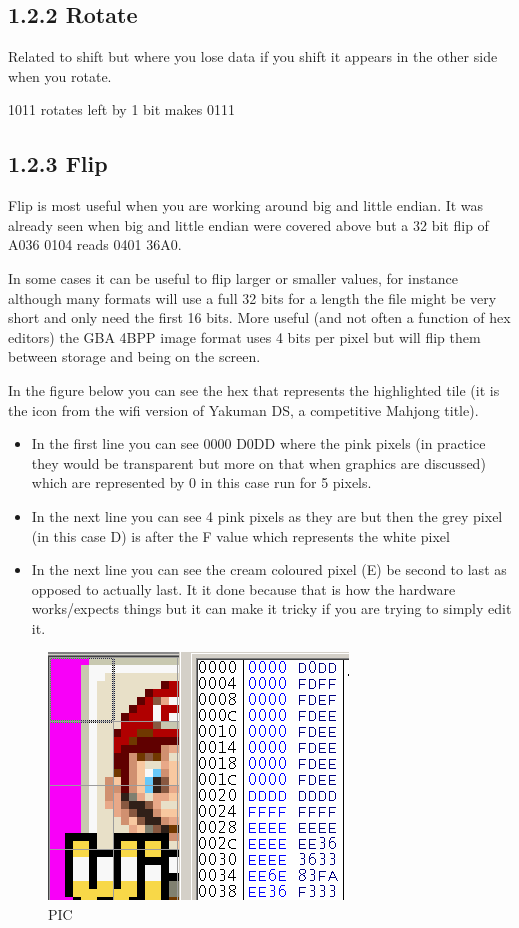 \documentclass[
]{book}
\providecommand{\tightlist}{%
  \setlength{\itemsep}{0pt}\setlength{\parskip}{0pt}}
\begin{document}
\hypertarget{rotate}{%
\subsection{1.2.2 Rotate}\label{rotate}}

Related to shift but where you lose data if you shift it appears in the other side when you rotate.

1011 rotates left by 1 bit makes 0111

\hypertarget{flip}{%
\subsection{1.2.3 Flip}\label{flip}}

Flip is most useful when you are working around big and little endian. It was already seen when big and little endian were covered above but a 32 bit flip of A036 0104 reads 0401 36A0.

In some cases it can be useful to flip larger or smaller values, for instance although many formats will use a full 32 bits for a length the file might be very short and only need the first 16 bits. More useful (and not often a function of hex editors) the GBA 4BPP image format uses 4 bits per pixel but will flip them between storage and being on the screen.

In the figure below you can see the hex that represents the highlighted tile (it is the icon from the wifi version of Yakuman DS, a competitive Mahjong title).

\begin{itemize}
\tightlist
\item
  In the first line you can see 0000 D0DD where the pink pixels (in practice they would be transparent but more on that when graphics are discussed) which are represented by 0 in this case run for 5 pixels.
\item
  In the next line you can see 4 pink pixels as they are but then the grey pixel (in this case D) is after the F value which represents the white pixel
\item
  In the next line you can see the cream coloured pixel (E) be second to last as opposed to actually last. It it done because that is how the hardware works/expects things but it can make it tricky if you are trying to simply edit it.
\end{itemize}

\begin{figure}
\centering
\includegraphics{images/0_home_fast6191_romhackingguide_unrenamed_files_and_original_borders_romhackingendiandemo.png}
\caption{PIC}
\end{figure}
\end{document}
